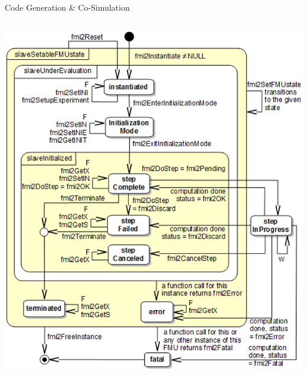 \documentclass[compress,newPxFont,sthlmFooter]{beamer}
\begin{document}
\begin{frame}{Code Generation \& Co-Simulation}
\begin{columns}[c]
      \begin{column}{0.45\paperwidth}
        \begin{center}
          \includegraphics[align=c, width=0.4\paperwidth]{StateMachineCoSimulation.png}
        \end{center}
      \end{column}
    \end{columns}
\end{frame}
\end{document}
